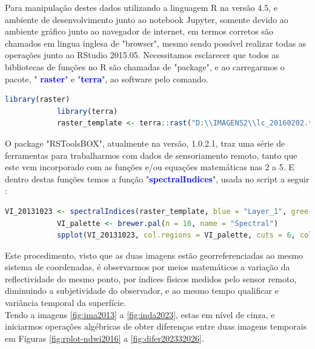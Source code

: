		\hspace*{1.25 cm} Para manipulação destes dados utilizando a linguagem R na versão 4.5, e ambiente de desenvolvimento junto ao notebook Jupyter, somente devido ao ambiente gráfico junto ao navegador de internet, em termos corretos são chamados em lingua inglesa de "browser", mesmo sendo possível realizar todas as operações junto ao RStudio 2015.05. Necessitamos esclarecer que  todos as bibliotecas de funções no R são chamadas de "package", e ao carregarmos o pacote, " \textbf{\textcolor{blue}{raster}}" e "\textbf{\textcolor{blue}{terra}}", ao software pelo comando.
		\lstset{
			language=R, %
			caption=Código para carregar imagens   em linguagem R,} %
		\begin{lstlisting}[language=R]
			library(raster)
			library(terra)
			raster_template <- terra::rast("D:\\IMAGENS2\\lc_20160202.tif")	   
		\end{lstlisting} 
		\hspace*{1.25 cm} O package "RSToolsBOX", atualmente na versão, 1.0.2.1, traz uma série de ferramentas para trabalharmos com dados de sensoriamento remoto, tanto que este vem incorporado com as funções e/ou equações matemáticas nas 2 a 5. E dentro destas funções temos a função  "\textbf{\textcolor{blue}{spectralIndices}}", usada no script a seguir :
		\lstset{
			language=R, %
			caption=Código para obter índices  em linguagem R,} %
		\begin{lstlisting}[language=R]
			VI_20131023 <- spectralIndices(raster_template, blue = "Layer_1", gree = "Layer_2" ,red = "Layer_3", nir = "Layer_4",swir2 =  "Layer_5", indices = c("NDVI", "NDWI","EVI2", "MSAVI") 
			VI_palette <- brewer.pal(n = 10, name = "Spectral")
			spplot(VI_20131023, col.regions = VI_palette, cuts = 6, col = "transparente")
		\end{lstlisting} 
		\hspace*{1.25 cm} Este procedimento, visto que as duas imagens estão georreferenciadas ao mesmo sistema  de coordenadas, é observarmos por meios matemáticos a variação da reflectividade do mesmo ponto, por índices físicos medidos pelo sensor remoto, diminuindo a subjetividade do observador, e ao mesmo tempo qualificar e variância temporal da superfície.\\
		\hspace*{1.25 cm} Tendo a imagens \ref{fig:ima2013} a  \ref{fig:inda2023}, estas em nível de cinza, e iniciarmos operações algébricas de obter diferenças entre duas imagens temporais em Figuras \ref{fig:rplot-ndwi2016} a \ref{fig:difer202332026}. \\
